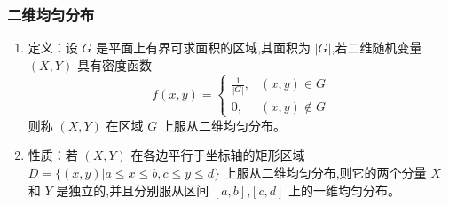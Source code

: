 \documentclass[UTF8]{ctexart}
\theoremstyle{remark}
\begin{document}
		\subsubsection{二维均匀分布}
		\begin{enumerate}
			\item 定义：设 \(G\) 是平面上有界可求面积的区域,其面积为 \(|G|\),若二维随机变量 \((X, Y)\) 具有密度函数
			\[
			f(x, y) = 
			\begin{cases}
				\frac{1}{|G|}, & (x, y) \in G\\
				0, & (x, y) \notin G
			\end{cases}
			\]
			则称 \((X, Y)\) 在区域 \(G\) 上服从二维均匀分布。
			\item 性质：若 \((X, Y)\) 在各边平行于坐标轴的矩形区域 \(D = \{(x, y)|a \leq x \leq b, c \leq y \leq d\}\) 上服从二维均匀分布,则它的两个分量 \(X\) 和 \(Y\) 是独立的,并且分别服从区间 \([a, b]\),\([c, d]\) 上的一维均匀分布。
		\end{enumerate}
		
\end{document}

